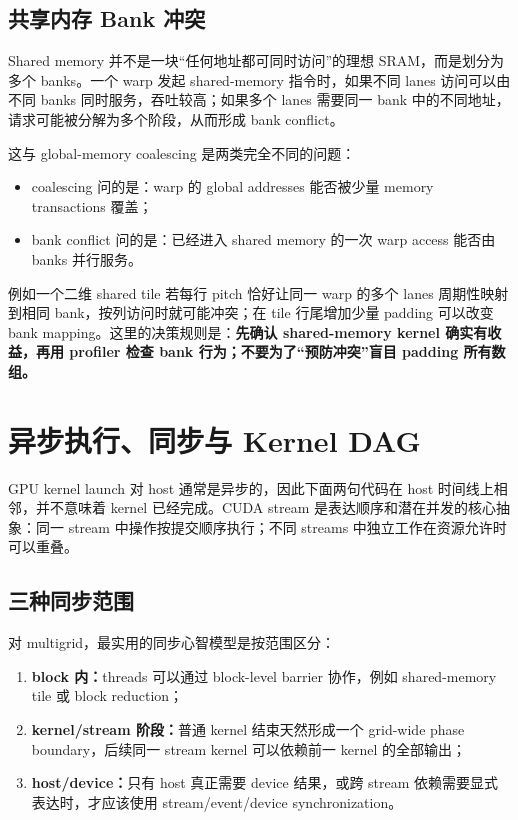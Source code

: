 \subsection{共享内存 Bank 冲突}

Shared memory 并不是一块“任何地址都可同时访问”的理想 SRAM，而是划分为多个 banks。一个 warp 发起 shared-memory 指令时，如果不同 lanes 访问可以由不同 banks 同时服务，吞吐较高；如果多个 lanes 需要同一 bank 中的不同地址，请求可能被分解为多个阶段，从而形成 bank conflict\cite{cudaProgramming2026}。

这与 global-memory coalescing 是两类完全不同的问题：
\begin{itemize}
\item coalescing 问的是：warp 的 global addresses 能否被少量 memory transactions 覆盖；
\item bank conflict 问的是：已经进入 shared memory 的一次 warp access 能否由 banks 并行服务。
\end{itemize}

例如一个二维 shared tile 若每行 pitch 恰好让同一 warp 的多个 lanes 周期性映射到相同 bank，按列访问时就可能冲突；在 tile 行尾增加少量 padding 可以改变 bank mapping。这里的决策规则是：\textbf{先确认 shared-memory kernel 确实有收益，再用 profiler 检查 bank 行为；不要为了“预防冲突”盲目 padding 所有数组。}

\section{异步执行、同步与 Kernel DAG}
\label{sec:gpu-async-dag}

GPU kernel launch 对 host 通常是异步的，因此下面两句代码在 host 时间线上相邻，并不意味着 kernel 已经完成。CUDA stream 是表达顺序和潜在并发的核心抽象：同一 stream 中操作按提交顺序执行；不同 streams 中独立工作在资源允许时可以重叠\cite{cudaProgramming2026}。

\subsection{三种同步范围}

对 multigrid，最实用的同步心智模型是按范围区分：

\begin{enumerate}
\item \textbf{block 内：}threads 可以通过 block-level barrier 协作，例如 shared-memory tile 或 block reduction；
\item \textbf{kernel/stream 阶段：}普通 kernel 结束天然形成一个 grid-wide phase boundary，后续同一 stream kernel 可以依赖前一 kernel 的全部输出；
\item \textbf{host/device：}只有 host 真正需要 device 结果，或跨 stream 依赖需要显式表达时，才应该使用 stream/event/device synchronization。
\end{enumerate}

